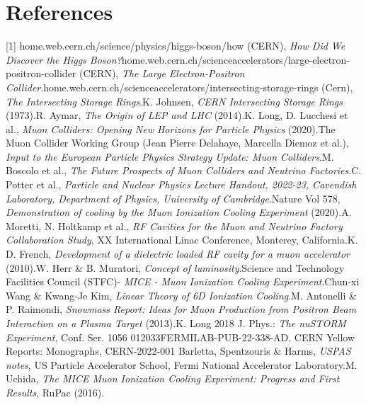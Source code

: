 \documentclass{article}
\begin{document}
	\section{References}
	[1] home.web.cern.ch/science/physics/higgs-boson/how (CERN), \textit{How Did We Discover the Higgs Boson?}\newline
	[2] home.web.cern.ch/scienceaccelerators/large-electron-positron-collider (CERN), \textit{The Large Electron-Positron Collider}.\newline
	[3] home.web.cern.ch/scienceaccelerators/intersecting-storage-rings (Cern), \textit{The Intersecting Storage Rings}.\newline
	[4] K. Johnsen, \textit{CERN Intersecting Storage Rings} (1973).\newline
	[5] R. Aymar, \textit{The Origin of LEP and LHC} (2014).\newline
	[6] K. Long, D. Lucchesi et al., \textit{Muon Colliders: Opening New Horizons for Particle Physics} (2020).\newline
	[7] The Muon Collider Working Group (Jean Pierre Delahaye, Marcella Diemoz et al.), \textit{Input to the European Particle Physics Strategy Update: Muon Colliders}.\newline
	[8] M. Boscolo et al., \textit{The Future Prospects of Muon Colliders and Neutrino Factories}.\newline
	[9] C. Potter et al., \textit{Particle and Nuclear Physics Lecture Handout, 2022-23, Cavendish Laboratory, Department of Physics, University of Cambridge}.\newline
	[10] Nature Vol 578, \textit{Demonstration of cooling by the Muon Ionization Cooling Experiment} (2020).\newline
	[11] A. Moretti, N. Holtkamp et al., \textit{RF Cavities for the Muon and Neutrino Factory Collaboration Study}, XX International Linac Conference, Monterey, California.\newline
	[12] K. D. French, \textit{Development of a dielectric loaded RF cavity for a muon accelerator} (2010).\newline
	[13] W. Herr \& B. Muratori, \textit{Concept of luminosity}.\newline
	[14] Science and Technology Facilities Council (STFC)- \textit{MICE - Muon Ionization Cooling Experiment}.\newline
	[15] Chun-xi Wang \& Kwang-Je Kim, \textit{Linear Theory of 6D Ionization Cooling}.\newline
	[16] M. Antonelli \& P. Raimondi, \textit{Snowmass Report: Ideas for Muon Production from Positron Beam Interaction on a Plasma Target} (2013).\newline
	[17] K. Long 2018 J. Phys.: \textit{The nuSTORM Experiment}, Conf. Ser. 1056 012033\newline
	[18] FERMILAB-PUB-22-338-AD, CERN Yellow Reports: Monographs, CERN-2022-001 \newline
	[19] Barletta, Spentzouris \& Harms, \textit{USPAS notes}, US Particle Accelerator School, Fermi National Accelerator Laboratory.\newline
	[20] M. Uchida, \textit{The MICE Muon Ionization Cooling Experiment: Progress and First Results}, RuPac (2016).
	
	
\end{document}
